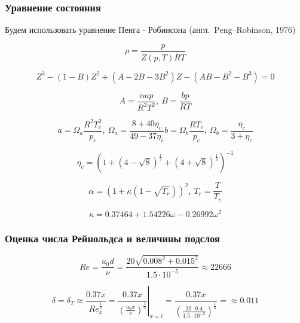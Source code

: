 \documentclass[10pt,xcolor={dvipsnames,table},aspectratio=169]{beamer}
\begin{document}
    \begin{frame}{}

        \justifying
        \normalsize

        \frametitle{Уравнение состояния}

        Будем использовать уравнение Пенга - Робинсона (англ.~Peng–Robinson, 1976)

        \[
            \rho = \frac{p}{Z \left( p, T \right) \bar{R} T}
        \]

        \[
            Z^{3} - \left( 1 - B \right) Z^{2} + \left( A - 2B - 3B^{2} \right) Z - \left( AB - B^{2} - B^{3} \right) = 0
        \]

        \[
            A = \frac{\alpha a p}{R^{2} T^{2}}, \: B = \frac{b p}{R T}
        \]

        \[
            a = \Omega_{a} \frac{R^{2} T^{2}_{c}}{p_{c}}, \:
            \Omega_{a} = \frac{8 + 40 \eta_{c}}{49 - 37 \eta_{c}}
            b = \Omega_{b} \frac{R T_{c}}{p_{c}}, \:
            \Omega_{b} = \frac{\eta_{c}}{3 + \eta_{c}}
        \]

        \[
            \eta_{c} = \left( 1 + \left( 4 - \sqrt{8} \right)^{\frac{1}{3}} + \left( 4 + \sqrt{8} \right)^{\frac{1}{3}} \right)^{-1}
        \]

        \[
            \alpha = \left( 1 + \kappa \left( 1 - \sqrt{T_{r}} \right) \right)^{2}, \: T_{r} = \frac{T}{T_{c}}
        \]

        \[
            \kappa = 0.37464 + 1.54226 \omega - 0.26992 \omega^{2}
        \]

    \end{frame}

    \begin{frame}{}

        \justifying
        \normalsize

        \frametitle{Оценка числа Рейнольдса и величины подслоя}

        \[
            Re = \frac{u_{0} d}{\nu} = \frac{20 \sqrt{0.008^{2} + 0.015^{2}}}{1.5 \cdot 10^{-5}} \approx 22666
        \]

        \[
            \delta = \delta_{T} \approx \frac{0.37 x}{Re^{\frac{1}{5}}_{x}} = \left. \frac{0.37 x}{\left( \frac{u_{0} x}{\nu} \right)^{\frac{1}{5}}} \right|_{x = l} = \frac{0.37 x}{\left( \frac{20 \cdot 0.4}{1.5 \cdot 10^{-5}} \right)^{\frac{1}{5}}} = \approx 0.011
        \]

    \end{frame}
\end{document}
